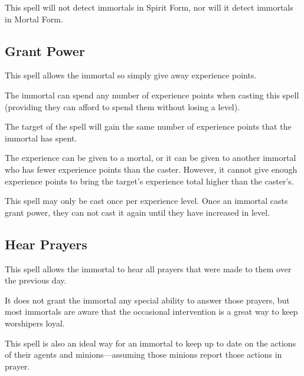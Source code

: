 \begin{multicols*}{2}
This spell will not detect immortals in Spirit Form, nor will it detect immortals in Mortal Form.

\subsection{Grant Power}

This spell allows the immortal so simply give away experience points.

The immortal can spend any number of experience points when casting this spell (providing they can afford to spend them without losing a level).

The target of the spell will gain the same number of experience points that the immortal has spent.

The experience can be given to a mortal, or it can be given to another immortal who has fewer experience points than the caster. However, it cannot give enough experience points to bring the target’s experience total higher than the caster’s.

This spell may only be cast once per experience level. Once an immortal casts grant power, they can not cast it again until they have increased in level.

\subsection{Hear Prayers}

This spell allows the immortal to hear all prayers that were made to them over the previous day.

It does not grant the immortal any special ability to answer those prayers, but most immortals are aware that the occasional intervention is a great way to keep worshipers loyal.

This spell is also an ideal way for an immortal to keep up to date on the actions of their agents and minions—assuming those minions report those actions in prayer.


\end{multicols*}
